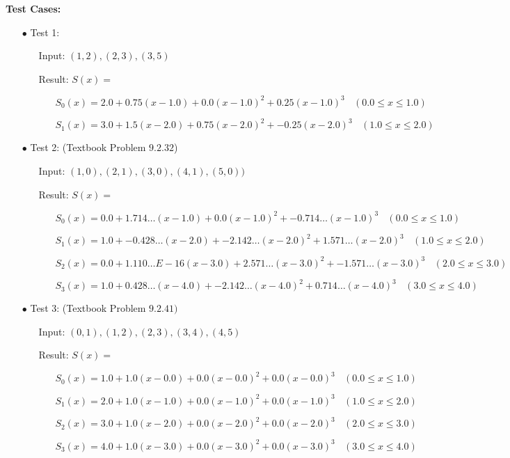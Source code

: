 \documentclass{amsart}
\begin{document}
\textbf{Test Cases:}
\begin{enumerate}

	\item[\(\bullet\)] Test 1:
	\begin{enumerate}
		\item[] Input: \((1, 2), (2, 3), (3, 5)\)
		\item[] Result: \(S(x) = \)
		\begin{enumerate}
			\item[] \(S_0(x) = 2.0 + 0.75(x - 1.0) + 0.0(x - 1.0)^2 + 0.25(x - 1.0)^3 \ \ \ \ (0.0 \leq x \leq1.0)\) 
			\item[] \(S_1(x) = 3.0 + 1.5(x - 2.0) + 0.75(x - 2.0)^2 + -0.25(x - 2.0)^3\ \ \ \ (1.0 \leq x \leq2.0)\)
		\end{enumerate}
	\end{enumerate}
		
	\item[\(\bullet\)] Test 2: (Textbook Problem \(9.2.32\))
	\begin{enumerate}
		\item[] Input: \((1, 0), (2, 1), (3, 0), (4, 1), (5, 0))\)
		\item[] Result: \(S(x) = \)
		\begin{enumerate}
			\item[] \(S_0(x) = 0.0 + 1.714\ldots(x - 1.0) + 0.0(x - 1.0)^2 + -0.714\ldots(x - 1.0)^3\ \ \ \ (0.0 \leq x \leq1.0)\)
			\item[] \(S_1(x) = 1.0 + -0.428\ldots(x - 2.0) + -2.142\ldots(x - 2.0)^2 + 1.571\ldots(x - 2.0)^3\ \ \ \ (1.0 \leq x \leq2.0)\)
			\item[] \(S_2(x) = 0.0 + 1.110\ldots E-16(x - 3.0) + 2.571\ldots(x - 3.0)^2 + -1.571\ldots(x - 3.0)^3\ \ \ \ (2.0 \leq x \leq3.0)\)
			\item[] \(S_3(x) = 1.0 + 0.428\ldots(x - 4.0) + -2.142\ldots(x - 4.0)^2 + 0.714\ldots(x - 4.0)^3\ \ \ \ (3.0 \leq x \leq4.0)\)
		\end{enumerate}
	\end{enumerate}
	
	\item[\(\bullet\)] Test 3: (Textbook Problem \(9.2.41)\)
	\begin{enumerate}
		\item[] Input: \((0, 1), (1, 2), (2, 3), (3, 4), (4, 5)\)
		\item[] Result: \(S(x) = \)
		\begin{enumerate}
			\item[] \(S_0(x) = 1.0 + 1.0(x - 0.0) + 0.0(x - 0.0)^2 + 0.0(x - 0.0)^3\ \ \ \ (0.0 \leq x \leq1.0)\)
			\item[] \(S_1(x) = 2.0 + 1.0(x - 1.0) + 0.0(x - 1.0)^2 + 0.0(x - 1.0)^3\ \ \ \ (1.0 \leq x \leq2.0)\)
			\item[] \(S_2(x) = 3.0 + 1.0(x - 2.0) + 0.0(x - 2.0)^2 + 0.0(x - 2.0)^3\ \ \ \ (2.0 \leq x \leq3.0)\)
			\item[] \(S_3(x) = 4.0 + 1.0(x - 3.0) + 0.0(x - 3.0)^2 + 0.0(x - 3.0)^3\ \ \ \ (3.0 \leq x \leq4.0)\)
		\end{enumerate}
	\end{enumerate}
\end{enumerate}		
		
\end{document}
